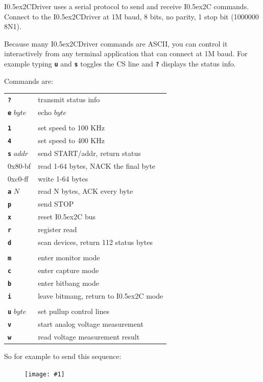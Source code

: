 \documentclass{article}
\newcommand{\two}{\raise0.5ex\hbox{\footnotesize{2}}}
\newcommand{\iic}{I\two{}C}
\newcommand{\iicdriver}{I\two{}CDriver}
\newcommand{\png}[1]{
\begin{figure}[H]
\begin{center}
\texttt{[image: \#1]}
\end{center}
\end{figure}
}
\newcommand{\mach}[1]{\texttt{\textbf{#1}}}
\newcommand{\gap}{\vspace{10pt}}
\begin{document}
\iicdriver{} uses a serial protocol to send and receive \iic{} commands.
Connect to the \iicdriver{} at 1M baud, 8 bits, no parity, 1 stop bit (1000000 8N1).

Because many \iicdriver{} commands are ASCII, you can control it interactively from any
terminal application that can connect at 1M baud.
For example typing \mach{u} and \mach{s} toggles the CS line and \mach{?} displays the status info.

Commands are:

\gap\begin{tabular}{ll}
\hline
  \mach{?}        & transmit status info \\
  \mach{e} $byte$ & echo $byte$\\
\\
  \mach{1}        & set speed to 100 KHz\\
  \mach{4}        & set speed to 400 KHz\\
  \mach{s} $addr$ & send START/addr, return status\\
  0x80-bf         & read 1-64 bytes, NACK the final byte\\
  0xc0-ff         & write 1-64 bytes\\
  \mach{a} $N$    & read N bytes, ACK every byte\\
  \mach{p}        & send STOP\\
  \mach{x}        & reset \iic{} bus\\
  \mach{r}        & register read\\
  \mach{d}        & scan devices, return 112 status bytes\\
\\
  \mach{m}        & enter monitor mode\\
  \mach{c}        & enter capture mode\\
  \mach{b}        & enter bitbang mode\\
  \mach{i}        & leave bitmang, return to \iic{} mode\\
\\
  \mach{u} $byte$ & set pullup control lines\\
  \mach{v}        & start analog voltage measurement\\
  \mach{w}        & read voltage measurement result\\
\hline
\end{tabular}\gap

So for example to send this sequence:

\png{img/i2cdriver/hero3}
\end{document}

